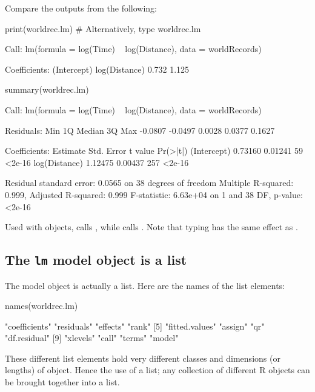 Compare the outputs from the following:
\begin{fullwidth}
\begin{Schunk}
\begin{Sinput}
print(worldrec.lm)    # Alternatively, type worldrec.lm
\end{Sinput}
\begin{Soutput}

Call:
lm(formula = log(Time) ~ log(Distance), data = worldRecords)

Coefficients:
  (Intercept)  log(Distance)  
        0.732          1.125  
\end{Soutput}
\begin{Sinput}
summary(worldrec.lm)
\end{Sinput}
\begin{Soutput}

Call:
lm(formula = log(Time) ~ log(Distance), data = worldRecords)

Residuals:
    Min      1Q  Median      3Q     Max 
-0.0807 -0.0497  0.0028  0.0377  0.1627 

Coefficients:
              Estimate Std. Error t value Pr(>|t|)
(Intercept)    0.73160    0.01241      59   <2e-16
log(Distance)  1.12475    0.00437     257   <2e-16

Residual standard error: 0.0565 on 38 degrees of freedom
Multiple R-squared:  0.999,	Adjusted R-squared:  0.999 
F-statistic: 6.63e+04 on 1 and 38 DF,  p-value: <2e-16
\end{Soutput}
\end{Schunk}
\end{fullwidth}

 Used with
 objects,  calls , while
 calls .
Note that typing  has the same effect as
.

\subsection{The \texttt{lm} model object is a list}

The model object is actually a list. Here are the names of the list
elements:
\begin{Schunk}
\begin{Sinput}
names(worldrec.lm)
\end{Sinput}
\begin{Soutput}
 [1] "coefficients"  "residuals"     "effects"       "rank"         
 [5] "fitted.values" "assign"        "qr"            "df.residual"  
 [9] "xlevels"       "call"          "terms"         "model"        
\end{Soutput}
\end{Schunk}
These different list elements hold very different classes and
dimensions (or lengths) of object. Hence the use of a list; any
collection of different R objects can be brought together into a
list.

